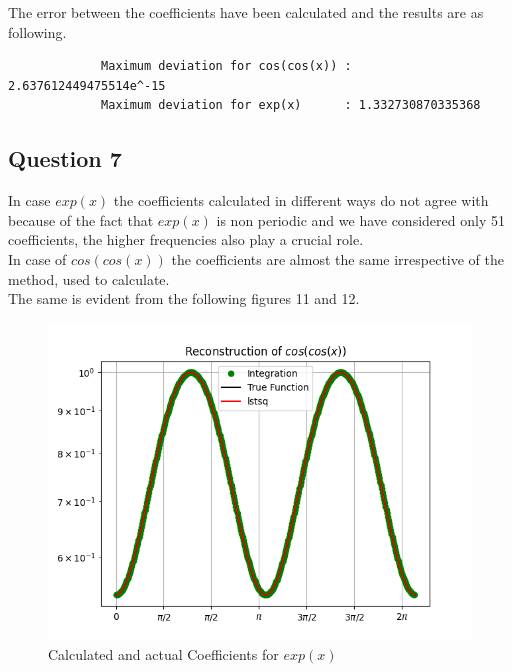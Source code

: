 \documentclass[11pt, a4paper]{article}
\begin{document}
           The error between the coefficients have been calculated and the results are as following.
           
            \begin{verbatim}
             Maximum deviation for cos(cos(x)) : 2.637612449475514e^-15
             Maximum deviation for exp(x)      : 1.332730870335368
            \end{verbatim}
            
           \subsection{Question 7}
           In case $exp(x)$ the coefficients calculated in different ways do not agree with because of the fact that $exp(x)$ is non periodic and we have considered only 51 coefficients, the higher frequencies also play a crucial role.
           \\In case of $cos(cos(x))$ the coefficients are almost the same irrespective of the method, used to calculate.
           \\ The same is evident from the following figures 11 and 12.            
            \begin{figure}[H]
                \centering
                \includegraphics[scale=0.9]{Figure 7.png}
                \caption{Calculated and actual Coefficients for $exp(x)$}                
            \end{figure}                
\end{document}
